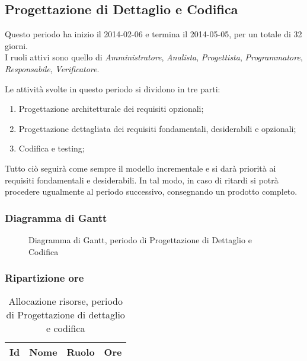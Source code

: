 	\pagebreak
	\subsection{Progettazione di Dettaglio e Codifica}
	 
Questo periodo ha inizio il 2014-02-06 e termina il 2014-05-05, per un totale di 32 giorni. \\
I ruoli attivi sono quello di \textit{Amministratore}, \textit{Analista}, \textit{Progettista}, \textit{Programmatore}, \textit{Responsabile}, \textit{Verificatore}.

Le attività svolte in questo periodo si dividono in tre parti:

\begin{enumerate}

	\item Progettazione architetturale dei requisiti opzionali;
	\item Progettazione dettagliata dei requisiti fondamentali, desiderabili e opzionali;
	\item Codifica e testing;

\end{enumerate}

Tutto ciò seguirà come sempre il modello incrementale e si darà priorità ai requisiti fondamentali e desiderabili.
In tal modo, in caso di ritardi si potrà procedere ugualmente al periodo successivo, consegnando un prodotto completo.

\subsubsection{Diagramma di Gantt}

\begin{figure}[H]
\centering
\scalebox{0.71}{%

	

}
\caption{Diagramma di Gantt, periodo di Progettazione di Dettaglio e Codifica}
\end{figure}

\subsubsection{Ripartizione ore}

\begin{table}[H]
\begin{adjustwidth}{-4cm}{-4cm}
	\centering
	\begin{tabular}{ l l l c  }
	\hline
	\multicolumn{1}{c}{\textbf{Id}} & 
	\multicolumn{1}{c}{\textbf{Nome}} & 
	\multicolumn{1}{c}{\textbf{Ruolo}}& 
	\multicolumn{1}{c}{\textbf{Ore}} \\
	\hline
	
		
	
	\end{tabular}
	\caption{Allocazione risorse, periodo di Progettazione di dettaglio e codifica}
\end{adjustwidth}
\end{table}	
	
